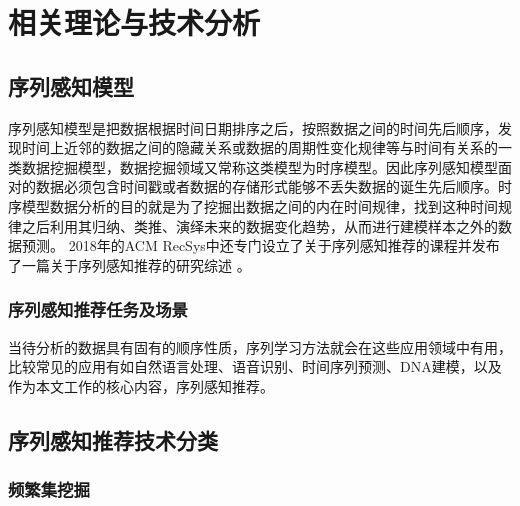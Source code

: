 ﻿%
\chapter{相关理论与技术分析}










\section{序列感知模型}
序列感知模型是把数据根据时间日期排序之后，按照数据之间的时间先后顺序，发现时间上近邻的数据之间的隐藏关系或数据的周期性变化规律等与时间有关系的一类数据挖掘模型，数据挖掘领域又常称这类模型为时序模型。因此序列感知模型面对的数据必须包含时间戳或者数据的存储形式能够不丢失数据的诞生先后顺序。时序模型数据分析的目的就是为了挖掘出数据之间的内在时间规律，找到这种时间规律之后利用其归纳、类推、演绎未来的数据变化趋势，从而进行建模样本之外的数据预测。
2018年的ACM RecSys中还专门设立了关于序列感知推荐的课程并发布了一篇关于序列感知推荐的研究综述
。



\subsection{序列感知推荐任务及场景}

当待分析的数据具有固有的顺序性质，序列学习方法就会在这些应用领域中有用，比较常见的应用有如自然语言处理、语音识别、时间序列预测、DNA建模，以及作为本文工作的核心内容，序列感知推荐。


\section{序列感知推荐技术分类}

\subsection{频繁集挖掘}

